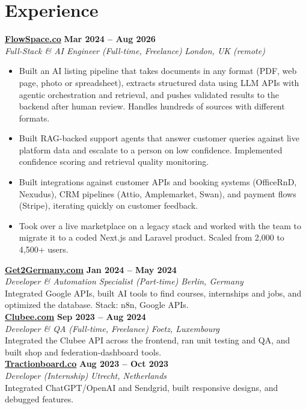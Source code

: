 \documentclass[a4paper,10pt]{article}
\newcommand{\role}[4]{%
 \textbf{#1} \hfill \textbf{#2}\\[1pt]%
 \textit{#3} \hfill \textit{#4}\\[2pt]%
}
\begin{document}
\section{Experience}

\role{\href{https://flowspace.co}{FlowSpace.co}}{Mar 2024 -- Aug 2026}{Full-Stack \& AI Engineer (Full-time, Freelance)}{London, UK (remote)}
\begin{itemize}
 \item Built an AI listing pipeline that takes documents in any format (PDF, web page, photo or spreadsheet), extracts structured data using LLM APIs with agentic orchestration and retrieval, and pushes validated results to the backend after human review. Handles hundreds of sources with different formats.
 \item Built RAG-backed support agents that answer customer queries against live platform data and escalate to a person on low confidence. Implemented confidence scoring and retrieval quality monitoring.
 \item Built integrations against customer APIs and booking systems (OfficeRnD, Nexudus), CRM pipelines (Attio, Amplemarket, Swan), and payment flows (Stripe), iterating quickly on customer feedback.
 \item Took over a live marketplace on a legacy stack and worked with the team to migrate it to a coded Next.js and Laravel product. Scaled from 2,000 to 4,500+ users.
\end{itemize}

\role{\href{https://get2germany.com}{Get2Germany.com}}{Jan 2024 -- May 2024}{Developer \& Automation Specialist (Part-time)}{Berlin, Germany}
Integrated Google APIs, built AI tools to find courses, internships and jobs, and optimized the database. Stack: n8n, Google APIs.\\[1pt]

\role{\href{https://clubee.com}{Clubee.com}}{Sep 2023 -- Aug 2024}{Developer \& QA (Full-time, Freelance)}{Foetz, Luxembourg}
Integrated the Clubee API across the frontend, ran unit testing and QA, and built shop and federation-dashboard tools.\\[1pt]

\role{\href{https://tractionboard.co}{Tractionboard.co}}{Aug 2023 -- Oct 2023}{Developer (Internship)}{Utrecht, Netherlands}
Integrated ChatGPT/OpenAI and Sendgrid, built responsive designs, and debugged features.

\end{document}

